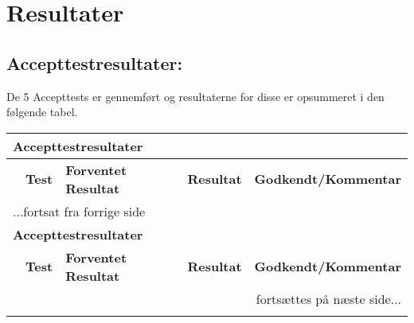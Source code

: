 \chapter{Resultater}

\section{Accepttestresultater: }
De 5 Accepttests er gennemført og resultaterne for disse er opsummeret i den følgende tabel.

\begin{center} \centering
    \begin{longtable}{|p{}|p{}|p{}|p{}|p{}|}
    \hline
        \multicolumn{5}{|l|}{\textbf{Accepttestresultater }} \\ \hline
        \multicolumn{1}{|c|}{} &
        \textbf{Test} &
        \textbf{Forventet \newline Resultat} &
        \textbf{Resultat} &
        \textbf{Godkendt\slash \newline Kommentar} \\ \hline 
        \endfirsthead

        \multicolumn{5}{l}{...fortsat fra forrige side} \\ \hline 
        \multicolumn{5}{|l|}{\textbf{Accepttestresultater }} \\ \hline
        \multicolumn{1}{|c|}{} &
        \textbf{Test} &
        \textbf{Forventet \newline Resultat} &
        \textbf{Resultat} &
        \textbf{Godkendt\slash \newline Kommentar} \\ \hline 
        \endhead

        \multicolumn{5}{r}{fortsættes på næste side...} \\
        \endfoot
        \endlastfoot
        

\end{longtable}
\end{center}
